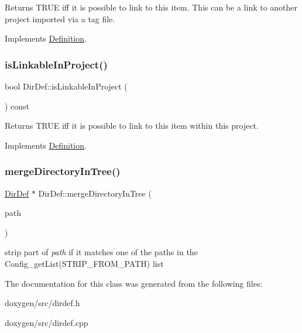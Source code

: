 Returns T\+R\+UE iff it is possible to link to this item. This can be a link to another project imported via a tag file. 

Implements \mbox{\hyperlink{class_definition_a4002fd79c2d4dcf667c37c83d4214deb}{Definition}}.

\mbox{\label{class_dir_def_a9d0906d74985d67bbeccc91d7068d99c}} 
\subsubsection{\texorpdfstring{isLinkableInProject()}{isLinkableInProject()}}
{\footnotesize\ttfamily bool Dir\+Def\+::is\+Linkable\+In\+Project (\begin{DoxyParamCaption}{ }\end{DoxyParamCaption}) const\hspace{0.3cm}{\ttfamily [virtual]}}

Returns T\+R\+UE iff it is possible to link to this item within this project. 

Implements \mbox{\hyperlink{class_definition_a845891c7206d40c3664b562636cdf9fc}{Definition}}.

\mbox{\label{class_dir_def_ab3b1d03c75471701969e581aa4a6960f}} 
\subsubsection{\texorpdfstring{mergeDirectoryInTree()}{mergeDirectoryInTree()}}
{\footnotesize\ttfamily \mbox{\hyperlink{class_dir_def}{Dir\+Def}} $\ast$ Dir\+Def\+::merge\+Directory\+In\+Tree (\begin{DoxyParamCaption}\item[{const \mbox{\hyperlink{class_q_c_string}{Q\+C\+String}} \&}]{path }\end{DoxyParamCaption})\hspace{0.3cm}{\ttfamily [static]}}

strip part of {\itshape path} if it matches one of the paths in the Config\+\_\+get\+List(\+S\+T\+R\+I\+P\+\_\+\+F\+R\+O\+M\+\_\+\+P\+A\+T\+H) list 

The documentation for this class was generated from the following files\+:\begin{DoxyCompactItemize}
\item 
doxygen/src/dirdef.\+h\item 
doxygen/src/dirdef.\+cpp\end{DoxyCompactItemize}
